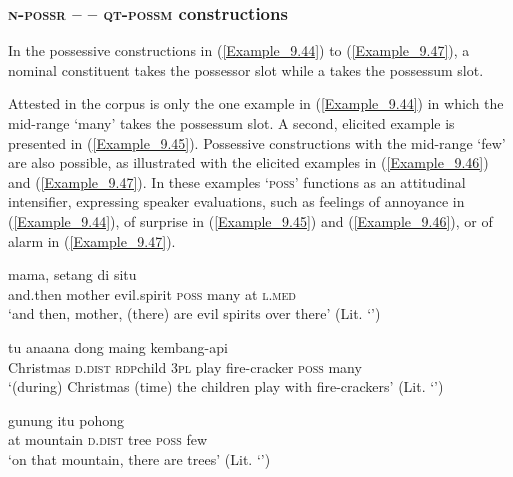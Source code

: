 \subsubsection[n{}-possr – punya – qt{}-possm constructions]{\textsc{n-possr} –  – \textsc{qt-possm} constructions}
\label{Para_9.3.3.1}
In the possessive constructions in (\ref{Example_9.44}) to (\ref{Example_9.47}), a nominal constituent takes the possessor slot while a  takes the possessum slot.



Attested in the corpus is only the one example in (\ref{Example_9.44}) in which the mid-range   ‘many’ takes the possessum slot. A second, elicited example is presented in (\ref{Example_9.45}). Possessive constructions with the mid-range   ‘few’ are also possible, as illustrated with the elicited examples in (\ref{Example_9.46}) and (\ref{Example_9.47}). In these examples  ‘\textsc{poss}’ functions as an attitudinal intensifier, expressing speaker evaluations, such as feelings of annoyance in (\ref{Example_9.44}), of surprise in (\ref{Example_9.45}) and (\ref{Example_9.46}), or of alarm in (\ref{Example_9.47}).



\ea
\label{Example_9.44}
 {mama,} {setang} {} {} {di} {situ}\\ %
 and.then  mother  evil.spirit  \textsc{poss}  many  at  \textsc{l.med}\\
\glt 
‘and then, mother, (there) are evil spirits over there’ (Lit. ‘’) \textstyleExampleSource{[081025-006-Cv.0062]}
\z

\ea
\label{Example_9.45}
 {tu} {ana{\Tilde}ana} {dong} {maing} {kembang-api} {} {}\\ %
 Christmas  \textsc{d.dist}  \textsc{rdp}{\Tilde}child  \textsc{3pl}  play  fire-cracker  \textsc{poss}  many\\
\glt 
‘(during) Christmas (time) the children play with  fire-crackers’ (Lit. ‘’) \textstyleExampleSource{[Elicited BR111020.005]}
\z

\ea
\label{Example_9.46}
 {gunung} {itu} {pohong} {} {}\\ %
 at  mountain  \textsc{d.dist}  tree  \textsc{poss}  few\\
\glt 
‘on that mountain, there are  trees’ (Lit. ‘’) \textstyleExampleSource{[Elicited BR111020.006]}
\z

